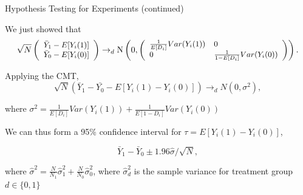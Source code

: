 \documentclass[11pt,english,handout]{beamer}
\newenvironment{wideitemize}{\itemize\addtolength{\itemsep}{10pt}}{\enditemize}
\begin{document}
\begin{frame}{Hypothesis Testing for Experiments (continued)}
\begin{wideitemize}
	\item
	We just showed that 
		$$\small \sqrt{N} \left(   \begin{array}{c}  \bar{Y}_1 - E[Y_i(1)] \\ 
		\bar{Y}_0 - E[Y_i(0)] 
	\end{array}  \right) \rightarrow_d \mathrm{N}\left(0 , \left(\begin{array}{ll} \frac{1}{E[D_i]} Var(Y_i(1)) & 0 \\ 0 & \frac{1}{1-E[D_i]} Var(Y_i(0)) \end{array} \right) \right).$$

\pause
\item
Applying the CMT, 
$$\sqrt{N} (\bar{Y}_1 -  \bar{Y_0} - E[Y_i(1) - Y_i(0)]) \rightarrow_d N(0 , \sigma^2),$$ 

\noindent where $\sigma^2 = \frac{1}{E[D_i]} Var(Y_i(1)) + \frac{1}{E[1-D_i]} Var(Y_i(0)) $ 

\pause

\item
We can thus form a 95\% confidence interval for $\tau = E[Y_i(1) - Y_i(0)]$,

$$\bar{Y}_1 - \bar{Y}_0 \pm  1.96 \hat\sigma / \sqrt{N},$$

\noindent where $\hat{\sigma}^2 = \frac{N}{N_1} \hat\sigma_1^2 + \frac{N}{N_0} \hat\sigma_0^2$, where $\hat{\sigma}^2_d$ is the sample variance for treatment group $d\in\{0,1\}$
\end{wideitemize}	
\end{frame}
\end{document}
